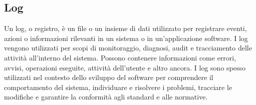 \vspace{2em}
\subsection*{Log}
Un log, o registro, è un file o un insieme di dati utilizzato per registrare eventi, azioni o informazioni rilevanti in un sistema o in un'applicazione software. I log vengono utilizzati per scopi di monitoraggio, diagnosi, audit e tracciamento delle attività all'interno del sistema. Possono contenere informazioni come errori, avvisi, operazioni eseguite, attività dell'utente e altro ancora. I log sono spesso utilizzati nel contesto dello sviluppo del software per comprendere il comportamento del sistema, individuare e risolvere i problemi, tracciare le modifiche e garantire la conformità agli standard e alle normative.
